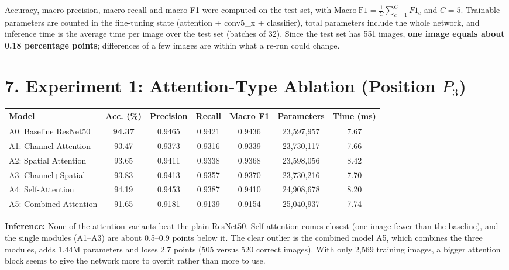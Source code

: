 \documentclass[10pt]{article}
\begin{document}
Accuracy, macro precision, macro recall and macro F1 were computed on the
test set, with $\mathrm{Macro\ F1}=\frac{1}{C}\sum_{c=1}^{C}F1_c$ and
$C=5$. Trainable parameters are counted in the fine-tuning state (attention
+ conv5\_x + classifier), total parameters include the whole network, and
inference time is the average time per image over the test set (batches of 32).
Since the test set has 551 images, \textbf{one image equals about 0.18
percentage points}; differences of a few images are within what a re-run
could change.

\section*{7. Experiment 1: Attention-Type Ablation (Position $P_3$)}

\begin{center}
\small
\begin{tabular}{|l|c|c|c|c|c|c|}
\hline
Model & Acc. (\%) & Precision & Recall & Macro F1 & Parameters & Time (ms)\\
\hline
A0: Baseline ResNet50 & \textbf{94.37} & 0.9465 & 0.9421 & 0.9436 & 23{,}597{,}957 & 7.67\\
A1: Channel Attention & 93.47 & 0.9373 & 0.9316 & 0.9339 & 23{,}730{,}117 & 7.66\\
A2: Spatial Attention & 93.65 & 0.9411 & 0.9338 & 0.9368 & 23{,}598{,}056 & 8.42\\
A3: Channel+Spatial & 93.83 & 0.9413 & 0.9357 & 0.9370 & 23{,}730{,}216 & 7.70\\
A4: Self-Attention & 94.19 & 0.9453 & 0.9387 & 0.9410 & 24{,}908{,}678 & 8.20\\
A5: Combined Attention & 91.65 & 0.9181 & 0.9139 & 0.9154 & 25{,}040{,}937 & 7.74\\
\hline
\end{tabular}
\end{center}

\textbf{Inference:} None of the attention variants beat the plain ResNet50.
Self-attention comes closest (one image fewer than the baseline), and the
single modules (A1--A3) are about 0.5--0.9 points below it. The clear
outlier is the combined model A5, which combines the three modules, adds 1.44M
parameters and loses 2.7 points (505 versus 520 correct images). With only
2{,}569 training images, a bigger attention block seems to give the network
more to overfit rather than more to use.
\end{document}
